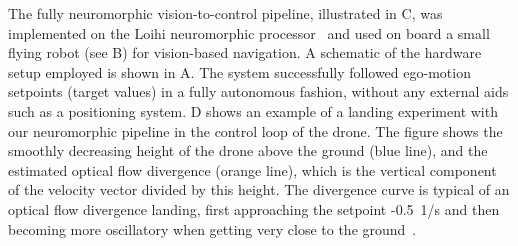 The fully neuromorphic vision-to-control pipeline, illustrated in C, was implemented on the Loihi neuromorphic processor~\cite{davies2018loihi} and used on board a small flying robot (see B) for vision-based navigation. A schematic of the hardware setup employed is shown in A. The system successfully followed ego-motion setpoints (target values) in a fully autonomous fashion, without any external aids such as a positioning system. D shows an example of a landing experiment with our neuromorphic pipeline in the control loop of the drone.
The figure shows the smoothly decreasing height of the drone above the ground (blue line), and the estimated optical flow divergence (orange line), which is the vertical component of the velocity vector divided by this height. The divergence curve is typical of an optical flow divergence landing, first approaching the setpoint -0.5~1/s and then becoming more oscillatory when getting very close to the ground~\cite{decroon2016monocular}.

